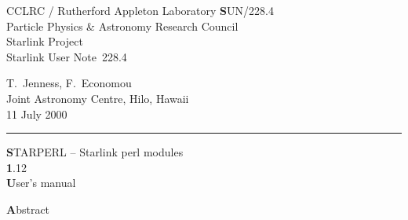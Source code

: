 \documentclass[twoside,11pt]{article}
\newcommand{\stardoccategory}  {Starlink User Note}
\newcommand{\stardocinitials}  {SUN}
\newcommand{\stardocnumber}    {228.4}
\newcommand{\stardocauthors}   {T.\ Jenness, F.\ Economou\\
                                Joint Astronomy Centre, Hilo, Hawaii}
\newcommand{\stardocdate}      {11 July 2000}
\newcommand{\stardoctitle}     {STARPERL -- Starlink perl modules}
\newcommand{\stardocversion}   {1.12}
\newcommand{\stardocmanual}    {User's manual}
\newcommand{\stardocname}{\stardocinitials /\stardocnumber}
\newenvironment{latexonly}{}{}
\renewcommand{\_}{\texttt{\symbol{95}}}
\begin{document}
\thispagestyle{empty}

\begin{latexonly}
  CCLRC / {\textsc Rutherford Appleton Laboratory} \hfill {\textbf \stardocname}\\
   {\large Particle Physics \& Astronomy Research Council}\\
   {\large Starlink Project\\}
   {\large \stardoccategory\ \stardocnumber}
   \begin{flushright}
   \stardocauthors\\
   \stardocdate
   \end{flushright}
   \vspace{-4mm}
   \rule{\textwidth}{0.5mm}
   \vspace{5mm}
   \begin{center}
   {\Huge\textbf  \stardoctitle \\ [2.5ex]}
   {\LARGE\textbf \stardocversion \\ [4ex]}
   {\Huge\textbf  \stardocmanual}
   \end{center}
   \vspace{5mm}


   \vspace{10mm}
   \begin{center}
      {\Large\textbf Abstract}
   \end{center}
\end{latexonly}
\end{document}
